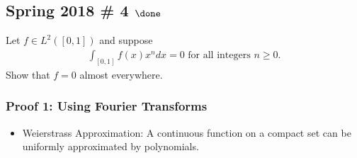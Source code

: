 \hypertarget{spring-2018-4-done}{%
\subsection{\texorpdfstring{Spring 2018 \# 4
\(\done\)}{Spring 2018 \# 4 \textbackslash done}}\label{spring-2018-4-done}}

Let \(f\in L^2([0, 1])\) and suppose
\begin{align*}
\int _{[0,1]} f(x) x^{n} d x=0 \text { for all integers } n \geq 0.
\end{align*}
Show that \(f = 0\) almost everywhere.

\begin{solution}

\hfill

\hypertarget{proof-1-using-fourier-transforms}{%
\subsubsection{Proof 1: Using Fourier
Transforms}\label{proof-1-using-fourier-transforms}}

\hfill

\begin{concept}

\hfill

\begin{itemize}
\tightlist
\item
  Weierstrass Approximation: A continuous function on a compact set can
  be uniformly approximated by polynomials.
\end{itemize}

\end{concept}


\end{solution}
